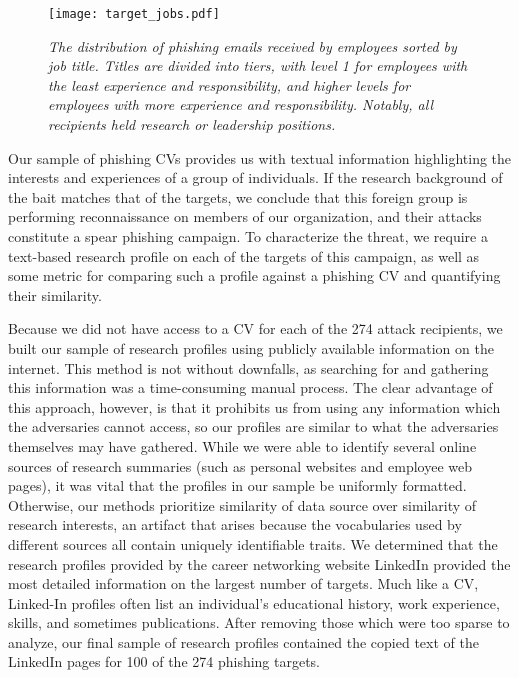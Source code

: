 \documentclass[conference]{IEEEtran}
\begin{document}
\begin{figure}[t!]
\begin{center}
\texttt{[image: target\_jobs.pdf]}
\caption{\sl The distribution of phishing emails received by employees sorted by job title.  Titles are divided into tiers, with level 1 for employees with the least experience and responsibility, and higher levels for 
employees with more experience and responsibility.  Notably, all recipients held research or leadership positions.\label{fig:jobs}}
\end{center}
\end{figure}
Our sample of phishing CVs provides us with textual information highlighting the interests and experiences of a group of individuals.  If the research background of the bait
matches that of the targets, we conclude that this foreign group is performing reconnaissance on members of our organization, and their attacks constitute a spear phishing campaign.  
To characterize the threat, we require a text-based research profile on each of the targets of this campaign, as well as some metric for comparing such a profile against a phishing CV and quantifying their 
similarity.

Because we did not have access to a CV for each of the 274 attack recipients, we built our sample of research profiles using publicly available information on the internet.  This 
method is not without downfalls, as searching for and gathering this information was a time-consuming manual process.  The clear advantage of this approach, however, is that it prohibits us from using any 
information which the adversaries cannot access, so our profiles are similar to what the adversaries themselves may have gathered.  While we were able to identify several online sources of research 
summaries (such as personal websites and employee web pages), it was vital that the profiles in our sample be uniformly formatted.  Otherwise, our methods prioritize similarity of data source 
over similarity of research interests, an artifact that arises because the vocabularies used by different sources all contain uniquely identifiable traits.  We determined that the research profiles 
provided by the career networking website LinkedIn \cite{linkedin} provided the most detailed information on the largest number of targets.  Much like a CV, Linked-In profiles 
often list an individual's educational history, work 
experience, skills, and sometimes publications.  After removing those which were too sparse to analyze, our final sample of research profiles contained the copied text of the LinkedIn pages
for 100 of the 274 
phishing targets.
\end{document}

